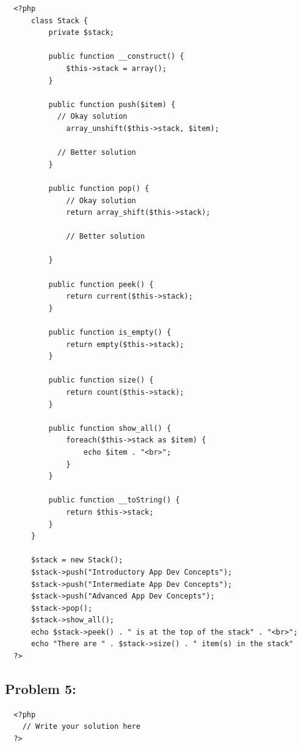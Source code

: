 \documentclass{article}
\begin{document}
\begin{verbatim}
  <?php
      class Stack {
          private $stack;

          public function __construct() {
              $this->stack = array();
          }

          public function push($item) {
            // Okay solution
              array_unshift($this->stack, $item); 

            // Better solution
          }

          public function pop() {
              // Okay solution
              return array_shift($this->stack);

              // Better solution
              
          }

          public function peek() {
              return current($this->stack);
          }

          public function is_empty() {
              return empty($this->stack);
          }

          public function size() {
              return count($this->stack);
          }

          public function show_all() {
              foreach($this->stack as $item) {
                  echo $item . "<br>";
              }
          }

          public function __toString() {
              return $this->stack;
          }
      }   
          
      $stack = new Stack();
      $stack->push("Introductory App Dev Concepts");
      $stack->push("Intermediate App Dev Concepts");
      $stack->push("Advanced App Dev Concepts");
      $stack->pop();
      $stack->show_all();
      echo $stack->peek() . " is at the top of the stack" . "<br>";
      echo "There are " . $stack->size() . " item(s) in the stack"
  ?>
\end{verbatim}

\subsection*{Problem 5:} 

\begin{verbatim}
  <?php
    // Write your solution here
  ?>
\end{verbatim}
\end{document}
